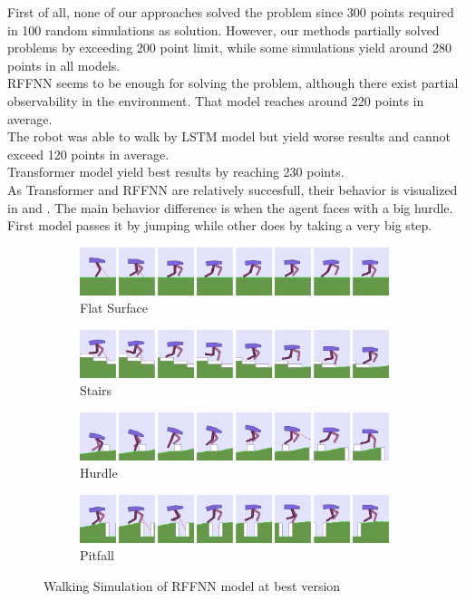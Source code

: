 First of all, none of our approaches solved the problem since 300 points required in 100 random simulations as solution. However, our methods partially solved problems by exceeding 200 point limit, while some simulations yield around 280 points in all models. \\
RFFNN seems to be enough for solving the problem, although there exist partial observability in the environment. That model reaches around 220 points in average. \\
The robot was able to walk by LSTM model but yield worse results and cannot exceed 120 points in average. \\
Transformer model yield best results by reaching 230 points.  \\
As Transformer and RFFNN are relatively succesfull, their behavior is visualized in  and . The main behavior difference is when the agent faces with a big hurdle. First model passes it by jumping while other does by taking a very big step.
%
\begin{figure}
	\centering
	\begin{subfigure}{.9\textwidth}
		\centering
		\includegraphics[width=0.99\textwidth]{figures/bipedal/anim/ff_flat.png}
		\caption{Flat Surface}
		\label{fig:anim_rffnn_flat}
	\end{subfigure}
	\begin{subfigure}{.9\textwidth}
		\centering
		\includegraphics[width=0.99\textwidth]{figures/bipedal/anim/ff_stairs.png}
		\caption{Stairs}
		\label{fig:anim_rffnn_stairs}
	\end{subfigure}
	\begin{subfigure}{.9\textwidth}
		\centering
		\includegraphics[width=0.99\textwidth]{figures/bipedal/anim/ff_hurdle.png}
		\caption{Hurdle}
		\label{fig:anim_rffnn_hurdle}
	\end{subfigure}
	\begin{subfigure}{.9\textwidth}
		\centering
		\includegraphics[width=0.99\textwidth]{figures/bipedal/anim/ff_pitfall.png}
		\caption{Pitfall}
		\label{fig:anim_rffnn_pitfall}
	\end{subfigure}
	\caption{Walking Simulation of RFFNN model at best version}
	\label{fig:rffnn_simulation}
\end{figure}

